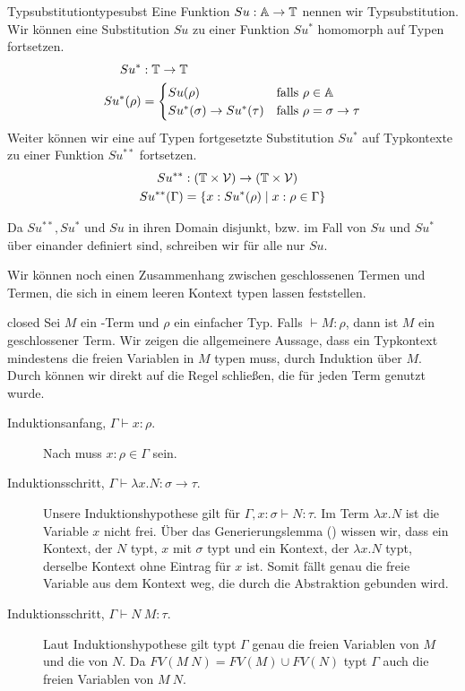 \begin{definition}{Typsubstitution}{typesubst}
Eine Funktion $Su : \mathbb{A}\to\mathbb{T}$ nennen wir Typsubstitution. 
Wir können eine Substitution $Su$ zu einer Funktion $Su^*$ homomorph auf Typen fortsetzen.
\begin{align*}
Su^* &: \mathbb{T}\to\mathbb{T}\\
Su^*(\rho) &=\begin{cases}
Su(\rho) & \text{falls } \rho\in\mathbb{A}\\
Su^*(\sigma)\to Su^*(\tau) & \text{falls } \rho = \sigma\to\tau
\end{cases}
\end{align*}
Weiter können wir eine auf Typen fortgesetzte Substitution $Su^*$ auf Typkontexte zu einer Funktion $Su^{**}$ fortsetzen.
\begin{align*}
Su^{**} & : (\mathbb{T}\times\mathcal{V})\to(\mathbb{T}\times\mathcal{V})\\
Su^{**}(\Gamma) & = \{x : Su^*(\rho)\mid x : \rho\in\Gamma\}
\end{align*}
\end{definition}
\begin{notation}
    Da $Su^{**}, Su^*$ und $Su$ in ihren Domain disjunkt, bzw. im Fall von $Su$ und $Su^*$ über einander definiert sind, schreiben wir für alle nur $Su$.
\end{notation}

Wir können noch einen Zusammenhang zwischen geschlossenen Termen und Termen, die sich in einem leeren Kontext typen lassen feststellen. 

\begin{lemma}{}{closed}
    Sei $M$ ein \tlambda-Term und $\rho$ ein einfacher Typ. Falls $\vdash M : \rho$, dann ist $M$ ein geschlossener Term.
    \Proof
    Wir zeigen die allgemeinere Aussage, dass ein Typkontext mindestens die freien Variablen in $M$ typen muss, durch Induktion über $M$. Durch  können wir direkt auf die Regel schließen, die für jeden Term genutzt wurde.
    \begin{description}
        \item[Induktionsanfang, $\Gamma\vdash x : \rho$.] Nach \var{} muss $x:\rho\in\Gamma$ sein.
        \item[Induktionsschritt, $\Gamma\vdash \lambda x.N : \sigma\to\tau$.] Unsere Induktionshypothese gilt für $\Gamma, x : \sigma \vdash N : \tau$. Im Term $\lambda x.N$ ist die Variable $x$ nicht frei. Über das Generierungslemma () wissen wir, dass ein Kontext, der $N$ typt, $x$ mit $\sigma$ typt und ein Kontext, der $\lambda x.N$ typt, derselbe Kontext ohne Eintrag für $x$ ist. Somit fällt genau die freie Variable aus dem Kontext weg, die durch die Abstraktion gebunden wird.
        \item[Induktionsschritt, $\Gamma\vdash N~M : \tau$.] Laut Induktionshypothese gilt typt $\Gamma$ genau die freien Variablen von $M$ und die von $N$. Da $FV(M~N) = FV(M)\cup FV(N)$ typt $\Gamma$ auch die freien Variablen von $M~N$.
    \end{description}       
\end{lemma}


